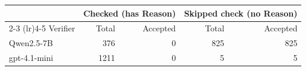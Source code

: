 \begin{tabular}{lrrrr}
\toprule
 & \multicolumn{2}{c}{Checked (has Reason)} & \multicolumn{2}{c}{Skipped check (no Reason)} \\
\cmidrule(lr){2-3} \cmidrule(lr){4-5}
Verifier & Total & Accepted & Total & Accepted \\
\midrule
Qwen2.5-7B & 376 & 0 & 825 & 825 \\
gpt-4.1-mini & 1211 & 0 & 5 & 5 \\
\bottomrule
\end{tabular}
